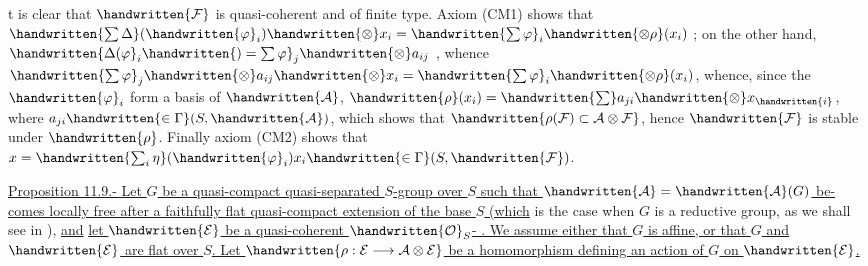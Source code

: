  t is clear that $\handwritten{\mathcal{F}}$ is quasi-coherent and of finite type. Axiom (CM1) shows that $\handwritten{\sum\Delta}(\handwritten{\varphi}_i)\handwritten{\otimes}x_i=\handwritten{\sum\varphi}_i\handwritten{\otimes\rho}(x_i)$ ; on the other hand, $\handwritten{\Delta(\varphi}_i\handwritten{)=\sum\varphi}_j\handwritten{\otimes}a_{ij}$ , whence $\handwritten{\sum\varphi}_j\handwritten{\otimes}a_{ij}\handwritten{\otimes}x_i=\handwritten{\sum\varphi}_i\handwritten{\otimes\rho}(x_i)$, whence, since the $\handwritten{\varphi}_i$ form a basis of $\handwritten{\mathcal{A}}$, $\handwritten{\rho}(x_i)=\handwritten{\sum}a_{ji}\handwritten{\otimes}x_{\handwritten{i}}$, where $a_{ji}\handwritten{\in\Gamma}(S,\handwritten{\mathcal{A}})$, which shows that $\handwritten{\rho(\mathcal{F})\subset\mathcal{A}\otimes\mathcal{F}}$, hence $\handwritten{\mathcal{F}}$ is stable under $\handwritten{\rho}$. Finally axiom (CM2) shows that $x=\handwritten{\sum_i\eta}(\handwritten{\varphi}_i)x_i\handwritten{\in\Gamma}(S,\handwritten{\mathcal{F}})$.

\uline{Proposition 11.9.- Let $G$ be a quasi-compact quasi-separated $S$-group over $S$ such that $\handwritten{\mathcal{A}}=\handwritten{\mathcal{A}}(G)$ be-\linebreak comes locally free after a faithfully flat quasi-compact extension of the base $S$ (which} is the case when $G$ is a reductive group, as we shall see in  ), \uline{and} \uline{let $\handwritten{\mathcal{E}}$ be a quasi-coherent $\handwritten{\mathcal{O}}_S$- . We assume either that $G$ is affine, or that $G$ and $\handwritten{\mathcal{E}}$ are flat over $S$. Let $\handwritten{\rho:\mathcal{E}\longrightarrow\mathcal{A}\otimes\mathcal{E}}$ be a homomorphism defining an action of $G$ on $\handwritten{\mathcal{E}}$.}
